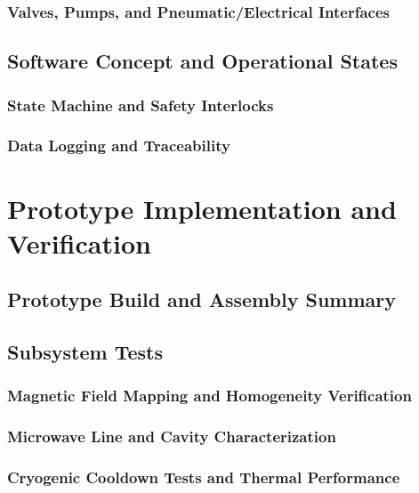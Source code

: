 \documentclass[FM,DP,EN,twoside]{tulthesis}
\begin{document}
\subsection{Valves, Pumps, and Pneumatic/Electrical Interfaces}
\label{subsec:valves-pumps-interfaces}
\section{Software Concept and Operational States}
\label{sec:software-concept-operational-states}
\subsection{State Machine and Safety Interlocks}
\label{subsec:state-machine-safety-interlocks}
\subsection{Data Logging and Traceability}
\label{subsec:data-logging-traceability}

\chapter{Prototype Implementation and Verification}
\label{sec:prototype-implementation-verification}
\section{Prototype Build and Assembly Summary}
\label{sec:prototype-build-assembly-summary}
\section{Subsystem Tests}
\label{sec:subsystem-tests}
\subsection{Magnetic Field Mapping and Homogeneity Verification}
\label{subsec:field-mapping-homogeneity-verification}
\subsection{Microwave Line and Cavity Characterization}
\label{subsec:mw-line-cavity-characterization}
\subsection{Cryogenic Cooldown Tests and Thermal Performance}
\label{subsec:cryogenic-cooldown-thermal-performance}
\end{document}
